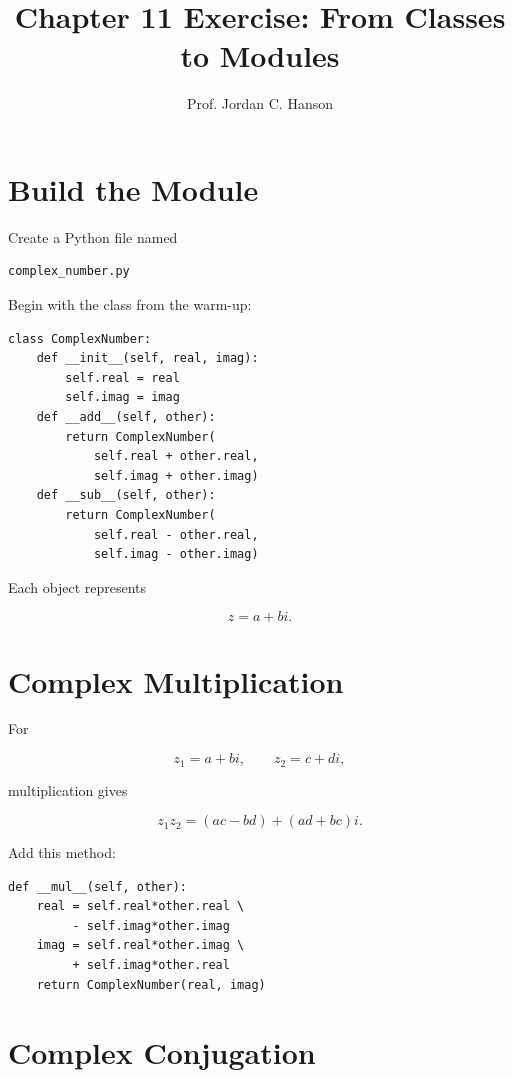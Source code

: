 \documentclass{article}
\begin{document}
\twocolumn

\title{Chapter 11 Exercise: From Classes to Modules}
\author{Prof. Jordan C. Hanson}
\date{}

\maketitle

\section{Build the Module}

Create a Python file named

\begin{verbatim}
complex_number.py
\end{verbatim}

Begin with the class from the warm-up:

\begin{verbatim}
class ComplexNumber:
    def __init__(self, real, imag):
        self.real = real
        self.imag = imag
    def __add__(self, other):
        return ComplexNumber(
            self.real + other.real,
            self.imag + other.imag)
    def __sub__(self, other):
        return ComplexNumber(
            self.real - other.real,
            self.imag - other.imag)
\end{verbatim}

Each object represents

\[
z=a+bi.
\]

\section{Complex Multiplication}

For

\[
z_1=a+bi,\qquad z_2=c+di,
\]

multiplication gives

\[
z_1z_2
=(ac-bd)+(ad+bc)i.
\]

Add this method:

\begin{verbatim}
def __mul__(self, other):
    real = self.real*other.real \
         - self.imag*other.imag
    imag = self.real*other.imag \
         + self.imag*other.real
    return ComplexNumber(real, imag)
\end{verbatim}

\section{Complex Conjugation}
\end{document}
